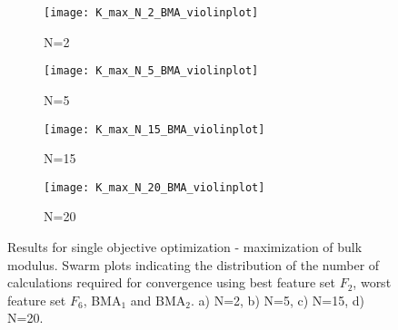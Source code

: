 \documentclass[preprint,amsmath,amssymb,aps, prb,showkeys]{revtex4-1}
\begin{document}
\begin{figure}[htp]
        \parbox{.975\textwidth}{
            \begin{subfigure}{.475\linewidth}
                \texttt{[image: K\_max\_N\_2\_BMA\_violinplot]}
                \caption{N=2}
                \label{fig:Max_bulk_N_2_BMA_swarm}
        \end{subfigure}
        	\begin{subfigure}{.475\linewidth}
                \texttt{[image: K\_max\_N\_5\_BMA\_violinplot]}
                \caption{N=5}
                \label{fig:Max_bulk_N_5_BMA_swarm}
        \end{subfigure}
        	\begin{subfigure}{.475\linewidth}
                \texttt{[image: K\_max\_N\_15\_BMA\_violinplot]}
                \caption{N=15}
                \label{fig:Max_bulk_N_15_BMA_swarm}
        \end{subfigure}
        	\begin{subfigure}{.475\linewidth}
                \texttt{[image: K\_max\_N\_20\_BMA\_violinplot]}
                \caption{N=20}
                \label{fig:Max_bulk_N_20_BMA_swarm}
        \end{subfigure}
        }
        \caption{ Results for single objective optimization - maximization of bulk modulus. Swarm plots indicating the distribution of the number of calculations required for convergence using best feature set $F_2$, worst feature set $F_6$, BMA$_1$ and BMA$_2$. a) N=2, b) N=5, c) N=15, d) N=20.}
        \label{fig:Max_bulk_modulus_BMA_swarm}
        
\end{figure} 
\end{document}
